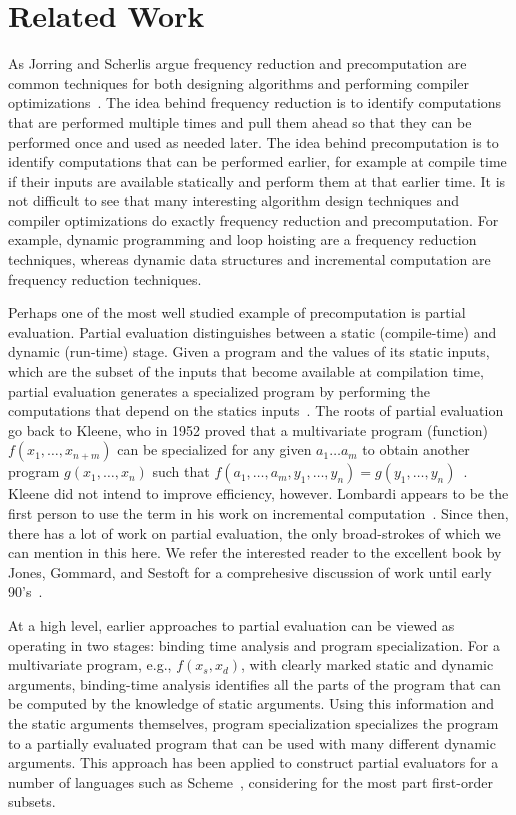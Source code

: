 \section{Related Work}

As Jorring and Scherlis argue frequency reduction and precomputation
are common techniques for both designing algorithms and performing
compiler optimizations~\cite{JS86-staging}.  The idea behind
frequency reduction is to identify computations that are performed
multiple times and pull them ahead so that they can be performed once
and used as needed later.  The idea behind precomputation is to
identify computations that can be performed earlier, for example at
compile time if their inputs are available statically and perform them
at that earlier time. It is not difficult to see that many interesting
algorithm design techniques and compiler optimizations do exactly
frequency reduction and precomputation.  For example, dynamic
programming and loop hoisting are a frequency reduction techniques,
whereas dynamic data structures and incremental computation are
frequency reduction techniques.

Perhaps one of the most well studied example of precomputation is
partial evaluation.  Partial evaluation distinguishes between a static
(compile-time) and dynamic (run-time) stage. Given a program and the
values of its static inputs, which are the subset of the inputs that
become available at compilation time, partial evaluation generates a
specialized program by performing the computations that depend on the
statics inputs~\cite{jones96}.  The roots of partial evaluation go
back to Kleene, who in 1952 proved that a multivariate program
(function) $f(x_1, \ldots, x_{n+m})$ can be specialized for any given
$a_1 \ldots a_m$ to obtain another program $g(x_1, \ldots, x_n)$ such
that $f(a_1, \ldots, a_m, y_1, \ldots, y_n) = g(y_1, \ldots,
y_n)$~\cite{Kleene52}.  Kleene did not intend to improve efficiency,
however.  Lombardi appears to be the first person to use the term in
his work on incremental computation~.  Since then,
there has a lot of work on partial evaluation, the only broad-strokes
of which we can mention in this here.  We refer the interested reader
to the excellent book by Jones, Gommard, and Sestoft for a
comprehesive discussion of work until early 90's~\cite{JGS93}.

At a high level, earlier approaches to partial evaluation can be
viewed as operating in two stages: binding time analysis and program
specialization.  For a multivariate program, e.g., $f(x_s,x_d)$, with
clearly marked static and dynamic arguments, binding-time analysis
identifies all the parts of the program that can be computed by the
knowledge of static arguments. Using this information and the static
arguments themselves, program specialization specializes the program
to a partially evaluated program that can be used with many different
dynamic arguments.  This approach has been applied to construct
partial evaluators for a number of languages such as 
Scheme~\cite{OB91-Similix,Consel88-Schism}, considering for the most
part first-order subsets.

